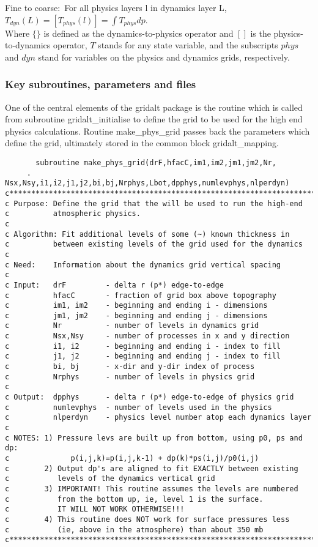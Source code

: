 Fine to coarse:\
For all physics layers l in dynamics layer L, $T_{dyn}(L) = [T_{phys}(l)] = \int{T_{phys} dp } $.\\

Where $\{\}$ is defined as the dynamics-to-physics operator and $[ ]$ is the physics-to-dynamics operator, $T$ stands for any state variable, and the subscripts $phys$ and $dyn$ stand for variables on
the physics and dynamics grids, respectively.

\subsubsection {Key subroutines, parameters and files } 

\noindent
One of the central elements of the gridalt package is the routine which 
is called from subroutine gridalt\_initialise to define the grid to be
used for the high end physics calculations. Routine make\_phys\_grid
passes back the parameters which define the grid, ultimately stored 
in the common block gridalt\_mapping.

\begin{verbatim}
       subroutine make_phys_grid(drF,hfacC,im1,im2,jm1,jm2,Nr,
     . Nsx,Nsy,i1,i2,j1,j2,bi,bj,Nrphys,Lbot,dpphys,numlevphys,nlperdyn)
c***********************************************************************
c Purpose: Define the grid that the will be used to run the high-end
c          atmospheric physics.
c
c Algorithm: Fit additional levels of some (~) known thickness in
c          between existing levels of the grid used for the dynamics
c
c Need:    Information about the dynamics grid vertical spacing
c
c Input:   drF         - delta r (p*) edge-to-edge
c          hfacC       - fraction of grid box above topography
c          im1, im2    - beginning and ending i - dimensions
c          jm1, jm2    - beginning and ending j - dimensions
c          Nr          - number of levels in dynamics grid
c          Nsx,Nsy     - number of processes in x and y direction
c          i1, i2      - beginning and ending i - index to fill
c          j1, j2      - beginning and ending j - index to fill
c          bi, bj      - x-dir and y-dir index of process
c          Nrphys      - number of levels in physics grid
c
c Output:  dpphys      - delta r (p*) edge-to-edge of physics grid
c          numlevphys  - number of levels used in the physics
c          nlperdyn    - physics level number atop each dynamics layer
c
c NOTES: 1) Pressure levs are built up from bottom, using p0, ps and dp:
c              p(i,j,k)=p(i,j,k-1) + dp(k)*ps(i,j)/p0(i,j)
c        2) Output dp's are aligned to fit EXACTLY between existing
c           levels of the dynamics vertical grid
c        3) IMPORTANT! This routine assumes the levels are numbered
c           from the bottom up, ie, level 1 is the surface.
c           IT WILL NOT WORK OTHERWISE!!!
c        4) This routine does NOT work for surface pressures less
c           (ie, above in the atmosphere) than about 350 mb
c***********************************************************************
\end{verbatim}

